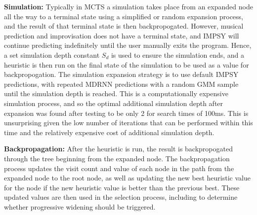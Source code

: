\textbf{Simulation:} 
Typically in MCTS a simulation takes place from an expanded node all the way to a terminal state using a simplified or random expansion process, and the result of that terminal state is then backpropogated. However, musical prediction and improvisation does not have a terminal state, and IMPSY will continue predicting indefinitely until the user manually exits the program. Hence, a set simulation depth constant $S_d$ is used to ensure the simulation ends, and a heuristic is then run on the final state of the simulation to be used as a value for backpropogation. The simulation expansion strategy is to use default IMPSY predictions, with repeated MDRNN predictions with a random GMM sample until the simulation depth is reached. This is a computationally expensive simulation process, and so the optimal additional simulation depth after expansion was found after testing to be only 2 for search times of 100ms. This is unsurprising given the low number of iterations that can be performed within this time and the relatively expensive cost of additional simulation depth.

\textbf{Backpropagation:}
After the heuristic is run, the result is backpropogated through the tree beginning from the expanded node. The backpropagation process updates the visit count and value of each node in the path from the expanded node to the root node, as well as updating the new best heuristic value for the node if the new heuristic value is better than the previous best. These updated values are then used in the selection process, including to determine whether progressive widening should be triggered.

